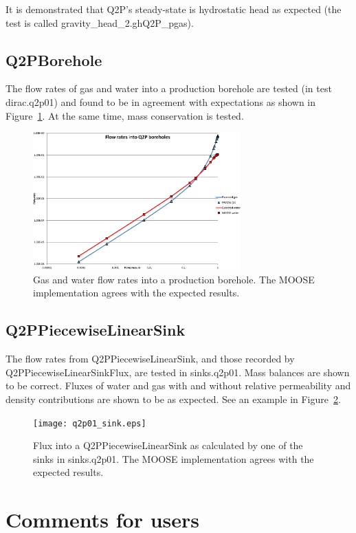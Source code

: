 \documentclass[]{scrreprt}
\begin{document}
It is demonstrated that Q2P's steady-state is hydrostatic head as
expected (the test is called gravity\_head\_2.ghQ2P\_pgas).

\section{Q2PBorehole}

The flow rates of gas and water into a production borehole are tested
(in test dirac.q2p01)
and found to be in agreement with expectations as shown in
Figure~\ref{bh.fig}.  At the same time, mass conservation is tested.

\begin{figure}[htb]
\centering
\includegraphics[width=8cm]{bh.eps}
\caption{Gas and water flow rates into a production borehole.  The
  MOOSE implementation agrees with the expected results.}
\label{bh.fig}
\end{figure}

\section{Q2PPiecewiseLinearSink}

The flow rates from Q2PPiecewiseLinearSink, and those recorded by
Q2PPiecewiseLinearSinkFlux, are tested in sinks.q2p01.  Mass balances
are shown to be correct.  Fluxes of water and gas with and without
relative permeability and density contributions are shown to be as
expected.  See an example in Figure~\ref{q2p01_sink.fig}.

\begin{figure}[htb]
\centering
\texttt{[image: q2p01\_sink.eps]}
\caption{Flux into a Q2PPiecewiseLinearSink as calculated by one of
  the sinks in sinks.q2p01.  The
  MOOSE implementation agrees with the expected results.}
\label{q2p01_sink.fig}
\end{figure}





\chapter{Comments for users}
\end{document}
